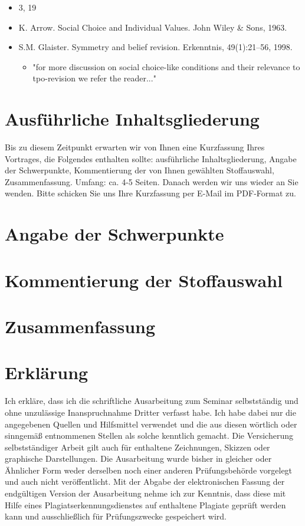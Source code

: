 \documentclass[11pt]{article}
\begin{document}
\begin{itemize}
    \begin{itemize}
        \item 3, 19
        \item K. Arrow. Social Choice and Individual Values. John Wiley \& Sons, 1963.
        \item S.M. Glaister. Symmetry and belief revision. Erkenntnis, 49(1):21–56, 1998.
        \begin{itemize}
            \item "for more discussion on social choice-like conditions and their relevance to tpo-revision we refer the reader..."
        \end{itemize}
    \end{itemize}
\end{itemize}


\section{Ausführliche Inhaltsgliederung}
Bis zu diesem Zeitpunkt erwarten wir von Ihnen eine Kurzfassung Ihres Vortrages, die  Folgendes enthalten sollte: ausführliche Inhaltsgliederung, Angabe der Schwerpunkte, Kommentierung der von Ihnen gewählten Stoffauswahl, Zusammenfassung. Umfang: ca. 4-5 Seiten. Danach werden wir uns wieder an Sie wenden. Bitte schicken Sie uns Ihre Kurzfassung per E-Mail im PDF-Format zu.
\section{Angabe der Schwerpunkte}
\section{Kommentierung der Stoffauswahl}
\section{Zusammenfassung}

\newpage

\section{Erklärung}
Ich erkläre, dass ich die schriftliche Ausarbeitung zum Seminar selbstständig und ohne unzulässige Inanspruchnahme Dritter verfasst habe. Ich habe dabei nur die angegebenen Quellen und Hilfsmittel verwendet und die aus diesen wörtlich oder sinngemäß entnommenen Stellen als solche kenntlich gemacht. Die Versicherung selbstständiger Arbeit gilt auch für enthaltene Zeichnungen, Skizzen oder graphische Darstellungen. Die Ausarbeitung wurde bisher in gleicher oder Ähnlicher Form weder derselben noch einer anderen Prüfungsbehörde vorgelegt und auch nicht veröffentlicht. Mit der Abgabe der elektronischen Fassung der endgültigen Version der Ausarbeitung nehme ich zur Kenntnis, dass diese mit Hilfe eines Plagiatserkennungsdienstes auf enthaltene Plagiate geprüft werden kann und ausschließlich für Prüfungszwecke gespeichert wird.
\end{document}

